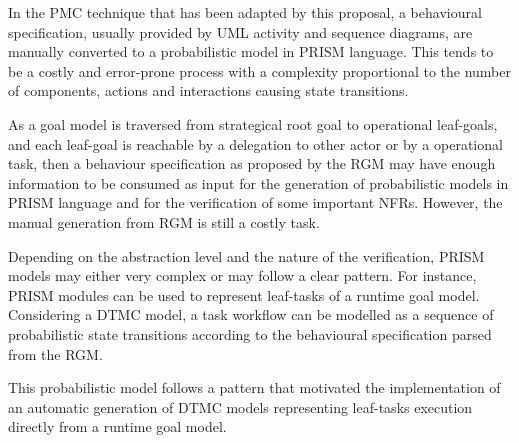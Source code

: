 In the PMC technique that has been adapted by this proposal, a behavioural specification, usually provided by UML activity and sequence diagrams, are manually converted to a probabilistic model in PRISM language. This tends to be a costly and error-prone process with a complexity proportional to the number of components, actions and interactions causing state transitions.  

As a goal model is traversed from strategical root goal to operational leaf-goals, and each leaf-goal is reachable by a delegation to other actor or by a operational task, then a behaviour specification as proposed by the RGM may have enough information to be consumed as input for the generation of probabilistic models in PRISM language and for the verification of some important NFRs. However, the manual generation from RGM is still a costly task.

Depending on the abstraction level and the nature of the verification, PRISM models may either very complex or may follow a clear pattern. For instance, PRISM modules can be used to represent leaf-tasks of a runtime goal model. Considering a DTMC model, a task workflow can be modelled as a sequence of probabilistic state transitions according to the behavioural specification parsed from the RGM.

This probabilistic model follows a pattern that motivated the implementation of an automatic generation of DTMC models representing leaf-tasks execution directly from a runtime goal model.
